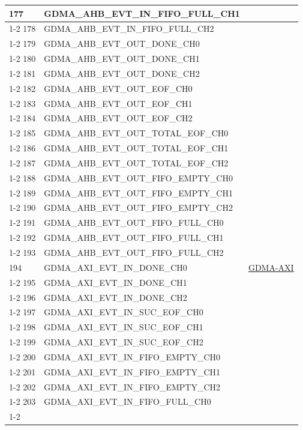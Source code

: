 \documentclass[main\_\_EN.tex]{subfiles}
\begin{document}
\begin{longtable}{ | l | l | l | }
177 & GDMA\_AHB\_EVT\_IN\_FIFO\_FULL\_CH1   & \\ \cline{1-2}
178 & GDMA\_AHB\_EVT\_IN\_FIFO\_FULL\_CH2   & \\ \cline{1-2}
179 & GDMA\_AHB\_EVT\_OUT\_DONE\_CH0 & \\ \cline{1-2}
180 & GDMA\_AHB\_EVT\_OUT\_DONE\_CH1 & \\ \cline{1-2}
181 & GDMA\_AHB\_EVT\_OUT\_DONE\_CH2 & \\ \cline{1-2}
182 & GDMA\_AHB\_EVT\_OUT\_EOF\_CH0  & \\ \cline{1-2}
183 & GDMA\_AHB\_EVT\_OUT\_EOF\_CH1  & \\ \cline{1-2}
184 & GDMA\_AHB\_EVT\_OUT\_EOF\_CH2  & \\ \cline{1-2}
185 & GDMA\_AHB\_EVT\_OUT\_TOTAL\_EOF\_CH0  & \\ \cline{1-2}
186 & GDMA\_AHB\_EVT\_OUT\_TOTAL\_EOF\_CH1  & \\ \cline{1-2}
187 & GDMA\_AHB\_EVT\_OUT\_TOTAL\_EOF\_CH2  & \\ \cline{1-2}
188 & GDMA\_AHB\_EVT\_OUT\_FIFO\_EMPTY\_CH0 & \\ \cline{1-2}
189 & GDMA\_AHB\_EVT\_OUT\_FIFO\_EMPTY\_CH1 & \\ \cline{1-2}
190 & GDMA\_AHB\_EVT\_OUT\_FIFO\_EMPTY\_CH2 & \\ \cline{1-2}
191 & GDMA\_AHB\_EVT\_OUT\_FIFO\_FULL\_CH0  & \\ \cline{1-2}
192 & GDMA\_AHB\_EVT\_OUT\_FIFO\_FULL\_CH1  & \\ \cline{1-2}
193 & GDMA\_AHB\_EVT\_OUT\_FIFO\_FULL\_CH2  & \\ \hline
194 & GDMA\_AXI\_EVT\_IN\_DONE\_CH0  & \hyperref[mod:dma]{GDMA-AXI} \\ \cline{1-2}
195 & GDMA\_AXI\_EVT\_IN\_DONE\_CH1  & \\ \cline{1-2}
196 & GDMA\_AXI\_EVT\_IN\_DONE\_CH2  & \\ \cline{1-2}
197 & GDMA\_AXI\_EVT\_IN\_SUC\_EOF\_CH0     & \\ \cline{1-2}
198 & GDMA\_AXI\_EVT\_IN\_SUC\_EOF\_CH1     & \\ \cline{1-2}
199 & GDMA\_AXI\_EVT\_IN\_SUC\_EOF\_CH2     & \\ \cline{1-2}
200 & GDMA\_AXI\_EVT\_IN\_FIFO\_EMPTY\_CH0  & \\ \cline{1-2}
201 & GDMA\_AXI\_EVT\_IN\_FIFO\_EMPTY\_CH1  & \\ \cline{1-2}
202 & GDMA\_AXI\_EVT\_IN\_FIFO\_EMPTY\_CH2  & \\ \cline{1-2}
203 & GDMA\_AXI\_EVT\_IN\_FIFO\_FULL\_CH0   & \\ \cline{1-2}

\end{longtable}
\end{document}
